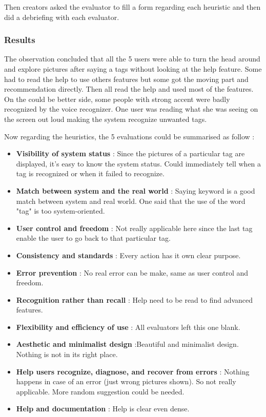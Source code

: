 \documentclass[11pt,a4paper]{article}
\begin{document}
Then creators asked the evaluator to fill a form regarding each heuristic and then did a debriefing with each evaluator.

\subsubsection{Results}

The observation concluded that all the 5 users were able to turn the head around and explore pictures after saying a tags without looking at the help feature. Some had to read the help to use others features but some got the moving part and recommendation directly. Then all read the help and used most of the features. On the could be better side, some people with strong accent were badly recognized by the voice recognizer. One user was reading what she was seeing on the screen out loud making the system recognize unwanted tags. 

Now regarding the heuristics, the 5 evaluations could be summarised as follow :
\begin{itemize}
	\item \textbf{Visibility of system status} : Since the pictures of a particular tag are displayed, it's easy to know the system status. Could immediately tell when a tag is recognized or when it failed to recognize.
	\item \textbf{Match between system and the real world} : Saying keyword is a good match between system and real world. One said that the use of the word "tag" is too system-oriented. 
	\item \textbf{User control and freedom} : Not really applicable here since the last tag enable the user to go back to that particular tag.
	\item \textbf{Consistency and standards} : Every action has it own clear purpose. 
	\item \textbf{Error prevention} : No real error can be make, same as user control and freedom.
	\item \textbf{Recognition rather than recall} : Help need to be read to find advanced features.
	\item \textbf{Flexibility and efficiency of use} : All evaluators left this one blank.
	\item \textbf{Aesthetic and minimalist design} :Beautiful and minimalist design. Nothing is not in its right place.
	\item \textbf{Help users recognize, diagnose, and recover from errors} : Nothing happens in case of an error (just wrong pictures shown). So not really applicable. More random suggestion could be needed.
	\item \textbf{Help and documentation} : Help is clear even dense.
\end{itemize}
\end{document}
